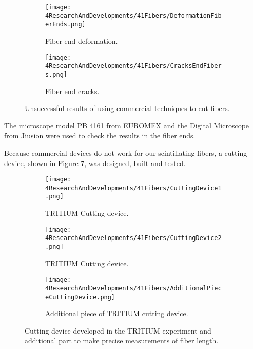 \begin{figure}
\centering
    \begin{subfigure}[b]{0.5\textwidth}
    \centering
    \texttt{[image: 4ResearchAndDevelopments/41Fibers/DeformationFiberEnds.png]}  
    \caption{Fiber end deformation.\label{subfig:FiberEndDeformation}}
    \end{subfigure}
    \hfill
    \begin{subfigure}[b]{0.45\textwidth}
    \centering
    \texttt{[image: 4ResearchAndDevelopments/41Fibers/CracksEndFibers.png]}  
    \caption{Fiber end cracks.\label{subfig:FiberEndCracks}}
    \end{subfigure}
 \caption{Unsuccessful results of using commercial techniques to cut fibers.}
 \label{fig:BadCutsOfFibers}
\end{figure}

The microscope model PB 4161 from EUROMEX and the Digital Microscope from Jiusion were used to check the results in the fiber ends. 

Because commercial devices do not work for our scintillating fibers, a cutting device, shown in Figure \ref{fig:CuttingTRITIUMDevice}, was designed, built and tested.

\begin{figure}
\centering
    \begin{subfigure}[b]{0.4\textwidth}
    \centering
    \texttt{[image: 4ResearchAndDevelopments/41Fibers/CuttingDevice1.png]}  
    \caption{TRITIUM Cutting device.\label{subfig:CuttingDevice1}}
    \end{subfigure}
    \hfill
    \begin{subfigure}[b]{0.55\textwidth}
    \centering
    \texttt{[image: 4ResearchAndDevelopments/41Fibers/CuttingDevice2.png]}  
    \caption{TRITIUM Cutting device.\label{subfig:CuttingDevice2}}
    \end{subfigure}
    \hfill
    \begin{subfigure}[b]{0.6\textwidth}
    \centering
    \texttt{[image: 4ResearchAndDevelopments/41Fibers/AdditionalPieceCuttingDevice.png]}  
    \caption{Additional piece of TRITIUM cutting device.\label{subfig:AdditionalPieceCuttingDevice}}
    \end{subfigure}
 \caption{Cutting device developed in the TRITIUM experiment and additional part to make precise measurements of fiber length.}
 \label{fig:CuttingTRITIUMDevice}
\end{figure}

